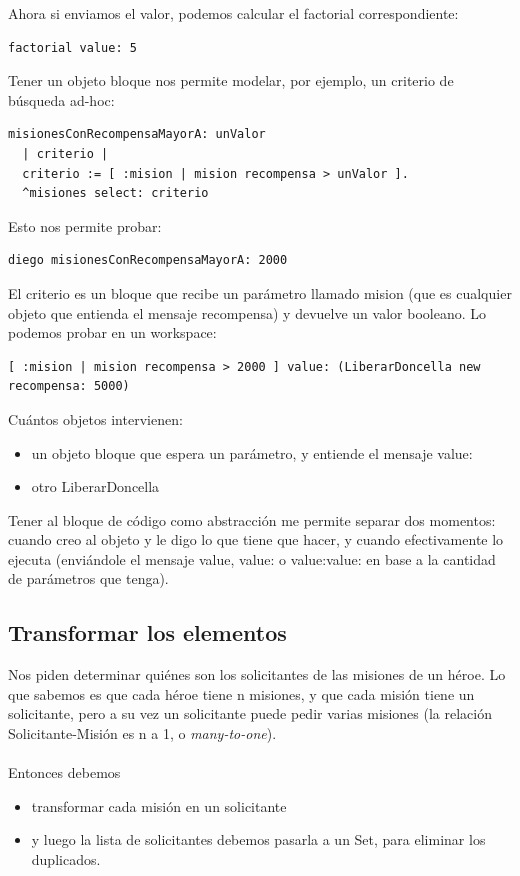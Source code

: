\documentclass[a4paper,12pt]{book}
\begin{document}
Ahora si enviamos el valor, podemos calcular el factorial correspondiente:

\begin{lstlisting}[frame=single]
factorial value: 5
\end{lstlisting}

Tener un objeto bloque nos permite modelar, por ejemplo, un criterio de búsqueda ad-hoc:

\begin{lstlisting}[frame=single]
misionesConRecompensaMayorA: unValor
  | criterio |
  criterio := [ :mision | mision recompensa > unValor ].
  ^misiones select: criterio 
\end{lstlisting}

Esto nos permite probar:

\begin{lstlisting}[frame=single]
diego misionesConRecompensaMayorA: 2000
\end{lstlisting}

El criterio es un bloque que recibe un parámetro llamado mision (que es cualquier objeto que entienda el mensaje
recompensa) y devuelve un valor booleano. Lo podemos probar en un workspace:

\begin{lstlisting}[frame=single]
[ :mision | mision recompensa > 2000 ] value: (LiberarDoncella new recompensa: 5000)
\end{lstlisting}

Cuántos objetos intervienen:

\begin{itemize}
 \item un objeto bloque que espera un parámetro, y entiende el mensaje value:
 \item otro LiberarDoncella
\end{itemize}

Tener al bloque de código como abstracción me permite separar dos momentos: cuando creo al objeto y le digo lo
que tiene que hacer, y cuando efectivamente lo ejecuta (enviándole el mensaje value, value: o value:value: en
base a la cantidad de parámetros que tenga).


\subsection{Transformar los elementos}
Nos piden determinar quiénes son los solicitantes de las misiones de un héroe. Lo que sabemos es que cada
héroe tiene n misiones, y que cada misión tiene un solicitante, pero a su vez un solicitante puede pedir
varias misiones (la relación Solicitante-Misión es n a 1, o \textit{many-to-one}).
\\
\\
Entonces debemos
\begin{itemize}
 \item transformar cada misión en un solicitante
 \item y luego la lista de solicitantes debemos pasarla a un Set, para eliminar los duplicados.
\end{itemize}
\end{document}
